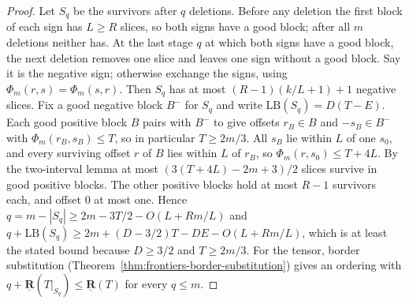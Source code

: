 \begin{proof}
  \leanok
  Let $S_q$ be the survivors after $q$ deletions. Before any deletion the first block of
  each sign has $L \ge R$ slices, so both signs have a good block; after all $m$ deletions
  neither has. At the last stage $q$ at which both signs have a good block, the next
  deletion removes one slice and leaves one sign without a good block. Say it is the
  negative sign; otherwise exchange the signs, using $\Phi_m(r, s) = \Phi_m(s, r)$. Then
  $S_q$ has at most $(R - 1)(k/L + 1) + 1$ negative slices. Fix a good negative block
  $B^-$ for $S_q$ and write $\mathrm{LB}(S_q) = D(T - E)$. Each good positive block $B$
  pairs with $B^-$ to give offsets $r_B \in B$ and $-s_B \in B^-$ with
  $\Phi_m(r_B, s_B) \le T$, so in particular $T \ge 2m/3$. All $s_B$ lie within $L$ of one
  $s_0$, and every surviving offset $r$ of $B$ lies within $L$ of $r_B$, so
  $\Phi_m(r, s_0) \le T + 4L$. By the two-interval lemma at most
  $(3(T + 4L) - 2m + 3)/2$ slices survive in good positive blocks. The other positive
  blocks hold at most $R - 1$ survivors each, and offset $0$ at most one. Hence
  $q = m - |S_q| \ge 2m - 3T/2 - O(L + Rm/L)$ and
  $q + \mathrm{LB}(S_q) \ge 2m + (D - 3/2)T - DE - O(L + Rm/L)$, which is at least the
  stated bound because $D \ge 3/2$ and $T \ge 2m/3$. For the tensor, border substitution
  (Theorem~\ref{thm:frontiers-border-substitution}) gives an ordering with
  $q + \underline{\mathbf{R}}(T|_{S_q}) \le \underline{\mathbf{R}}(T)$ for every
  $q \le m$.
\end{proof}

